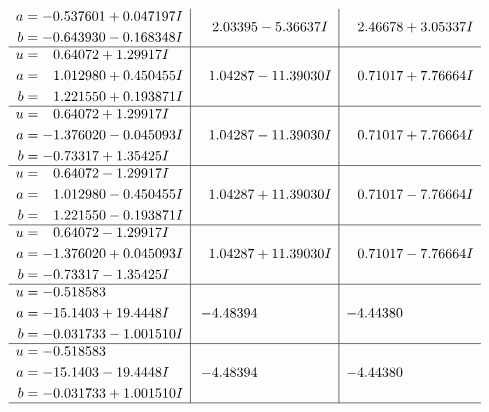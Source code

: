 \documentclass[1p]{elsarticle_modified}
\theoremstyle{definition}
\begin{document}
$$\begin{array}{c|c|c}
\begin{aligned}
a &= -0.537601 + 0.047197 I \\
b &= -0.643930 - 0.168348 I\end{aligned}
 & \phantom{-}2.03395 - 5.36637 I & \phantom{-}2.46678 + 3.05337 I \\ \hline\begin{aligned}
u &= \phantom{-}0.64072 + 1.29917 I \\
a &= \phantom{-}1.012980 + 0.450455 I \\
b &= \phantom{-}1.221550 + 0.193871 I\end{aligned}
 & \phantom{-}1.04287 - 11.39030 I & \phantom{-}0.71017 + 7.76664 I \\ \hline\begin{aligned}
u &= \phantom{-}0.64072 + 1.29917 I \\
a &= -1.376020 - 0.045093 I \\
b &= -0.73317 + 1.35425 I\end{aligned}
 & \phantom{-}1.04287 - 11.39030 I & \phantom{-}0.71017 + 7.76664 I \\ \hline\begin{aligned}
u &= \phantom{-}0.64072 - 1.29917 I \\
a &= \phantom{-}1.012980 - 0.450455 I \\
b &= \phantom{-}1.221550 - 0.193871 I\end{aligned}
 & \phantom{-}1.04287 + 11.39030 I & \phantom{-}0.71017 - 7.76664 I \\ \hline\begin{aligned}
u &= \phantom{-}0.64072 - 1.29917 I \\
a &= -1.376020 + 0.045093 I \\
b &= -0.73317 - 1.35425 I\end{aligned}
 & \phantom{-}1.04287 + 11.39030 I & \phantom{-}0.71017 - 7.76664 I \\ \hline\begin{aligned}
u &= -0.518583\phantom{ +0.000000I} \\
a &= -15.1403 + 19.4448 I \\
b &= -0.031733 - 1.001510 I\end{aligned}
 & -4.48394\phantom{ +0.000000I} & -4.44380\phantom{ +0.000000I} \\ \hline\begin{aligned}
u &= -0.518583\phantom{ +0.000000I} \\
a &= -15.1403 - 19.4448 I \\
b &= -0.031733 + 1.001510 I\end{aligned}
 & -4.48394\phantom{ +0.000000I} & -4.44380\phantom{ +0.000000I}\\
 \hline 
 \end{array}$$\newpage\newpage\renewcommand{\arraystretch}{1}
\end{document}
